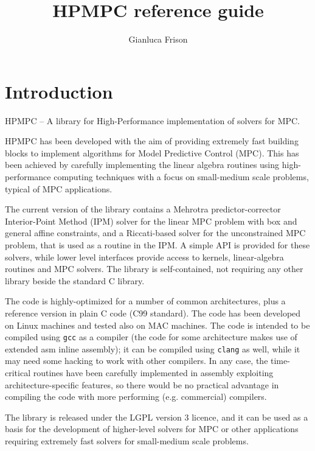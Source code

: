 \documentclass[a4paper]{report}
\title{HPMPC reference guide}
\author{Gianluca Frison}
\begin{document}
\maketitle
\tableofcontents

\chapter{Introduction}

HPMPC -- A library for High-Performance implementation of solvers for MPC.

HPMPC has been developed with the aim of providing extremely fast building blocks to implement algorithms for Model Predictive Control (MPC). 
This has been achieved by carefully implementing the linear algebra routines using high-performance computing techniques with a focus on small-medium scale problems, typical of MPC applications.

The current version of the library contains a Mehrotra predictor-corrector Interior-Point Method (IPM) solver for the linear MPC problem with box and general affine constraints, and a Riccati-based solver for the unconstrained MPC problem, that is used as a routine in the IPM.
A simple API is provided for these solvers, while lower level interfaces provide access to kernels, linear-algebra routines and MPC solvers.
The library is self-contained, not requiring any other library beside the standard C library.

The code is highly-optimized for a number of common architectures, plus a reference version in plain C code (C99 standard).
The code has been developed on Linux machines and tested also on MAC machines. 
The code is intended to be compiled using {\tt gcc} as a compiler (the code for some architecture makes use of extended asm inline assembly); it can be compiled using {\tt clang} as well, while it may need some hacking to work with other compilers.
In any case, the time-critical routines have been carefully implemented in assembly exploiting architecture-specific features, so there would be no practical advantage in compiling the code with more performing (e.g. commercial) compilers.

The library is released under the LGPL version 3 licence, and it can be used as a basis for the development of higher-level solvers for MPC or other applications requiring extremely fast solvers for small-medium scale problems.
\end{document}
